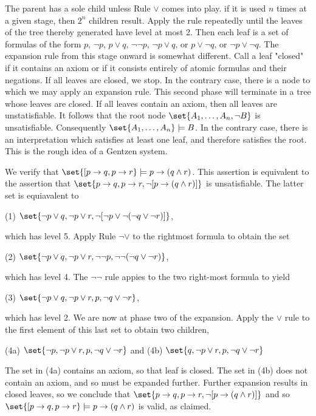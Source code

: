 The parent has a sole child unless Rule $\lor$ comes into play.  if it is used $n$ times at a given stage, then $2^n$ children result.  Apply the rule repeatedly until the leaves of the tree thereby generated have level at most 2.  Then each leaf is a set of formulas of the form $p$, $\neg p$, $p \lor q$, $\neg \neg p$, $\neg p \lor q$, or $p \lor \neg q$, or $\neg p \lor \neg q$. The expansion rule from this stage onward is somewhat different.  Call a leaf "closed" if it contains an axiom or if it consists entirely of atomic formulas and their negations.  If all leaves are closed, we stop.  In the contrary case, there is a node to which we may apply an expansion rule.  This
second phase will terminate in a tree whose leaves are closed.  If all leaves contain an axiom, then all leaves are unstatisfiable.  It follows that the root node $\set{A_1, \ldots, A_n, \neg B}$ is unsatisfiable.  Consequently $\set{A_1, \ldots, A_n} \models B$.   In the contrary case, there is an interpretation which satisfies at least one leaf, and therefore satisfies the root.  This is the rough idea of a Gentzen system.




We verify that $\set{ [ p \to q, p \to r} \models p \to (q \land r)$.  This assertion is equivalent to the assertion that $\set{p \to q, p \to r, \neg[ p \to (q \land r)] } $ is unsatisfiable.  The latter set is equiavalent to

\begin{indent}
(1)
$ \set{ \neg p \lor q, \neg p \lor r, \neg[\neg p \lor \neg(\neg q \lor \neg r)] }$,
\end{indent}

which has level 5.  Apply Rule $\neg \lor$ to the rightmost formula to obtain the set

\begin{indent}
(2)
$ \set{ \neg p \lor q, \neg p \lor r, \neg\neg p, \neg\neg(\neg q \lor \neg r) }$,
\end{indent}

which has level 4.  The $\neg\neg$ rule appies to the two right-most formula to yield

\begin{indent}
(3)
$ \set{ \neg p \lor q, \neg p \lor r,  p, \neg q \lor \neg r }$,
\end{indent}

which has level 2.  We are now at phase two of the expansion.  Apply the $\lor $ rule to the first element of this last set to obtain two children,

\begin{indent}
(4a) $\set{ \neg p, \neg p \lor r,  p, \neg q \lor \neg r }$  and (4b)   $\set{ q, \neg p \lor r,  p, \neg q \lor \neg r }$
\end{indent}

The set in (4a) contains an axiom, so that leaf is closed.  The set in (4b) does not contain an axiom, and so must be expanded further.  Further expansion results in closed leaves, so we conclude that $\set{p \to q, p \to r, \neg[ p \to (q \land r)] } $ and so $\set{ [ p \to q, p \to r} \models p \to (q \land r)$ is valid, as claimed.
